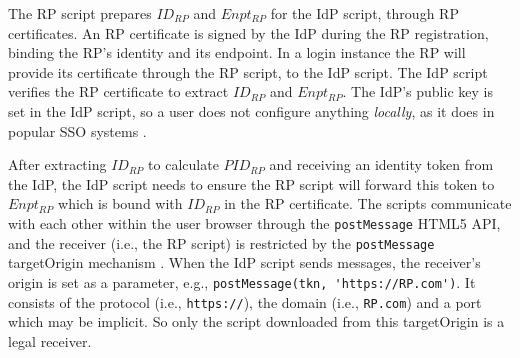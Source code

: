 The RP script prepares $ID_{RP}$ and $Enpt_{RP}$ for the IdP script, through RP certificates.
An RP certificate is signed by the IdP during the RP registration,
     binding the RP's identity and its endpoint. %
In a login instance
    the RP will provide its certificate through the RP script, to the IdP script.
The IdP script %
    verifies the RP certificate to extract $ID_{RP}$ and $Enpt_{RP}$.
The IdP's public key is set in the IdP script, so
 a user does not configure anything \emph{locally},
    as it does in popular SSO systems \cite{OpenIDConnect, rfc6749, SAML,SAMLIdentifier}.


After extracting $ID_{RP}$ to calculate $PID_{RP}$
    and receiving an identity token from the IdP,
    the IdP script needs to ensure the RP script will forward this token to $Enpt_{RP}$
        which is bound with $ID_{RP}$ in the RP certificate.
The scripts communicate with each other within the user browser through the \verb+postMessage+ HTML5 API,
and the receiver (i.e., the RP script)
 is restricted by the \verb+postMessage+ targetOrigin mechanism \cite{postm-targeto}.
When the IdP script sends messages,
 the receiver's origin is set as a parameter,
  e.g., \verb+postMessage(tkn, 'https://RP.com')+.
It consists of
    the protocol (i.e., \verb+https://+),
    the domain  (i.e., \verb+RP.com+)
    and a port which may be implicit.
So only the script downloaded from this targetOrigin is a legal receiver.


